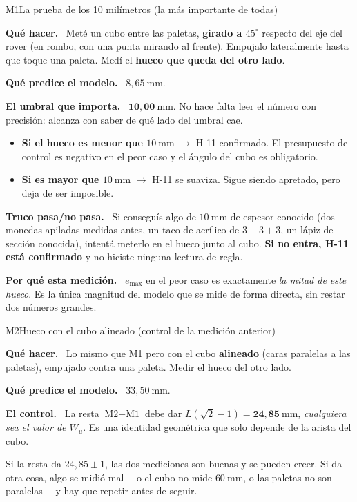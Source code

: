 \documentclass[11pt,a4paper]{article}
\theoremstyle{definition}
\newcommand{\grados}{^{\circ}}
\newcommand{\campo}[1]{\par\smallskip\noindent\textbf{#1.}\ }
\newcommand{\anota}[1]{\par\smallskip\noindent\fbox{\parbox[c][1.1cm][c]{0.97\linewidth}{\footnotesize\textsc{medido:}\hfill #1}}}
\begin{document}
\begin{medicion}{M1}{La prueba de los 10 milímetros \textnormal{(la más importante de todas)}}
\campo{Qué hacer} Meté un cubo entre las paletas, \textbf{girado a $45\grados$} respecto
del eje del rover (en rombo, con una punta mirando al frente). Empujalo lateralmente
hasta que toque una paleta. Medí el \textbf{hueco que queda del otro lado}.

\campo{Qué predice el modelo} $8{,}65\ \mathrm{mm}$.

\campo{El umbral que importa} $\mathbf{10{,}00\ \mathrm{mm}}$. No hace falta leer el
número con precisión: alcanza con saber de qué lado del umbral cae.
\begin{itemize}[leftmargin=1.6em,itemsep=2pt,topsep=3pt]
\item \textbf{Si el hueco es menor que $10\ \mathrm{mm}$} $\to$ H-11 confirmado. El
      presupuesto de control es negativo en el peor caso y el ángulo del cubo es
      obligatorio.
\item \textbf{Si es mayor que $10\ \mathrm{mm}$} $\to$ H-11 se suaviza. Sigue siendo
      apretado, pero deja de ser imposible.
\end{itemize}

\campo{Truco pasa/no pasa} Si conseguís algo de $10\ \mathrm{mm}$ de espesor conocido
(dos monedas apiladas medidas antes, un taco de acrílico de $3+3+3$, un lápiz de sección
conocida), intentá meterlo en el hueco junto al cubo. \textbf{Si no entra, H-11 está
confirmado} y no hiciste ninguna lectura de regla.

\campo{Por qué esta medición} $e_{\max}$ en el peor caso es exactamente
\emph{la mitad de este hueco}. Es la única magnitud del modelo que se mide de forma
directa, sin restar dos números grandes.
\anota{$\rule{4cm}{0.4pt}$ mm \quad$\Rightarrow$\quad $e_{\max} = \rule{2cm}{0.4pt}$ mm}
\end{medicion}

\begin{medicion}{M2}{Hueco con el cubo alineado \textnormal{(control de la medición anterior)}}
\campo{Qué hacer} Lo mismo que M1 pero con el cubo \textbf{alineado} (caras paralelas a
las paletas), empujado contra una paleta. Medir el hueco del otro lado.

\campo{Qué predice el modelo} $33{,}50\ \mathrm{mm}$.

\campo{El control} La resta $\text{M2} - \text{M1}$ debe dar
$L(\sqrt2 - 1) = \mathbf{24{,}85\ \mathrm{mm}}$, \emph{cualquiera sea el valor de
$W_u$}. Es una identidad geométrica que solo depende de la arista del cubo.

\smallskip
Si la resta da $24{,}85 \pm 1$, las dos mediciones son buenas y se pueden creer. Si da
otra cosa, algo se midió mal ---o el cubo no mide $60\ \mathrm{mm}$, o las paletas no
son paralelas--- y hay que repetir antes de seguir.
\anota{$\rule{4cm}{0.4pt}$ mm \quad$\Rightarrow$\quad M2 $-$ M1 $= \rule{2cm}{0.4pt}$ mm}
\end{medicion}
\end{document}
